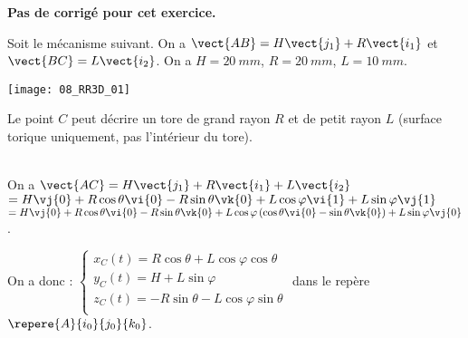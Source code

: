 \normalfalse \difficiletrue \tdifficilefalse
\correctiontrue


\setcounter{numques}{0}
\ifcorrection
\else
\textbf{Pas de corrigé pour cet exercice.}
\fi

\ifprof
\else
Soit le mécanisme suivant. On a $\vect{AB}=H\vect{j_1}+R\vect{i_1}$ et $\vect{BC}=L\vect{i_2}$. On a $H=\SI{20}{mm}$, $R=\SI{20}{mm}$, $L=\SI{10}{mm}$. 
\begin{center}
\texttt{[image: 08\_RR3D\_01]}
\end{center}
\fi


\ifprof
\else
{}
\fi
\ifprof
Le point $C$ peut décrire un tore de grand rayon $R$ et de petit rayon $L$ (surface torique uniquement, pas l'intérieur du tore). 
\else
\fi

\ifprof ~\\
On  a  $\vect{AC}=H\vect{j_1}+R\vect{i_1}+L\vect{i_2}$ $=H\vj{0}+R\cos\theta\vi{0}-R\sin\theta\vk{0}+L\cos\varphi\vi{1}+L\sin\varphi\vj{1}$ 
$=H\vj{0}+R\cos\theta\vi{0}-R\sin\theta\vk{0}+L\cos\varphi\left(\cos\theta\vi{0}-\sin\theta\vk{0} \right)+L\sin\varphi\vj{0}$ .

On a donc :
$\left\{
\begin{array}{l}
x_C(t)=R\cos\theta+L\cos\varphi\cos\theta \\
y_C(t)= H+L\sin\varphi\\
z_C(t)=  -R\sin\theta-L\cos\varphi\sin\theta\\
\end{array}
\right.
$ dans le repère $\repere{A}{i_0}{j_0}{k_0}$.
\else
\fi
